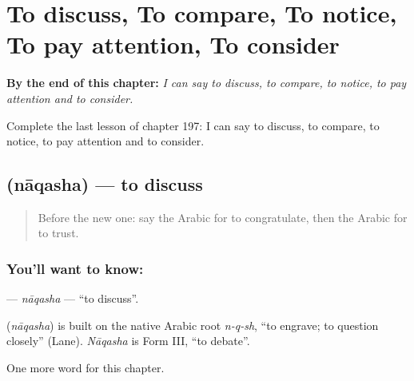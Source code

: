 
\chapter{To discuss, To compare, To notice, To pay attention, To consider}
\label{ch:ar-to-discuss-to-compare-to-notice-to-pay-attention-to-consider}

\begin{chapteropening}
\textbf{By the end of this chapter:} \emph{I can say to discuss, to compare, to notice, to pay attention and to consider.}

Complete the last lesson of chapter 197: I can say to discuss, to compare, to notice, to pay attention and to consider.
\end{chapteropening}

\section[\texorpdfstring{\ar{ناقش} (nāqasha)}{ناقش (nāqasha)}]{ (nāqasha) — to discuss}

\label{lesson:AR-C197-naqasha}



\begin{quote}
Before the new one: say the Arabic for to congratulate, then the Arabic for to trust.
\end{quote}

\subsection*{You'll want to know: }
\textbf{} — \emph{nāqasha} — \textquotedblleft{}to discuss\textquotedblright{}.

\begin{cousinweb}
\textbf{} (\emph{nāqasha}) is built on the native Arabic root \emph{n-q-sh}, \textquotedblleft{}to engrave; to question closely\textquotedblright{} (Lane). \emph{Nāqasha} is Form III, \textquotedblleft{}to debate\textquotedblright{}.
\end{cousinweb}

\begin{grammarlens}[title={What you've built}]
One more word for this chapter.
\end{grammarlens}

